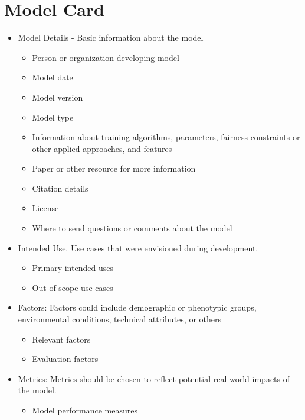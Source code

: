 %
%


\chapter{Model Card}

\begin{itemize}
  \item Model Details -  Basic information about the model
    \begin{itemize}
      \item Person or organization developing model
      \item Model date
      \item Model version
      \item Model type
      \item Information about training algorithms, parameters, fairness constraints or other applied approaches, and features
      \item Paper or other resource for more information
      \item Citation details
      \item License
      \item Where to send questions or comments about the model
    \end{itemize}
  \item Intended Use. Use cases that were envisioned during development.
    \begin{itemize}
      \item Primary intended uses
      \item Out-of-scope use cases
    \end{itemize}
  \item Factors: Factors could include demographic or phenotypic groups, environmental conditions, technical attributes, or others
    \begin{itemize}
      \item Relevant factors
      \item Evaluation factors
    \end{itemize}
  \item Metrics: Metrics should be chosen to reflect potential real world impacts of the model.
    \begin{itemize}
      \item   Model performance measures

\end{itemize}
\end{itemize}
